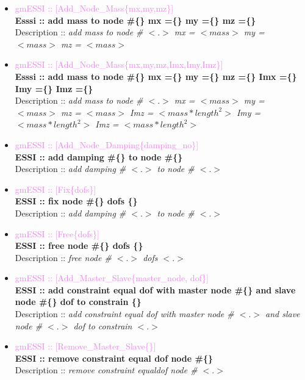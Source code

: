 \documentclass[11pt]{article}
\begin{document}
\begin{itemize}

  \item \textcolor{violet}{gmESSI :: [Add\_Node\_Mass\{mx,my,mz\}]}\\
  \textbf{Esssi :: add mass to node \#\{\} mx =\{\} my =\{\} mz =\{\}}\\
  Description :: \textit{add mass to node \# $<.>$ mx = $<mass>$ my = $<mass>$
  mz = $<mass>$}

  \item \textcolor{violet}{gmESSI :: [Add\_Node\_Mass\{mx,my,mz,Imx,Imy,Imz\}]} \\ 
  \textbf{Esssi :: add mass to node \#\{\} mx =\{\} my =\{\} mz =\{\} Imx =\{\} Imy =\{\} Imz
  =\{\}}\\   Description :: \textit{add mass to node \# $<.>$ mx = $<mass>$ my =
  $<mass>$ mz = $<mass>$ Imz = $<mass*length^2>$ Imy = $<mass*length^2>$ Imz =
  $<mass*length^2>$}

  \item \textcolor{violet}{ gmESSI :: [Add\_Node\_Damping\{damping\_no\}]}\\
  \textbf{ ESSI :: add damping \#\{\} to node \#\{\}}\\
  Description :: \textit{add damping \# $<.>$ to node \# $<.>$}

  \item \textcolor{violet}{ gmESSI :: [Fix\{dofs\}]}\\
  \textbf{ ESSI :: fix node \#\{\} dofs \{\}}\\
  Description :: \textit{add damping \# $<.>$ to node \# $<.>$}

  \item \textcolor{violet}{ gmESSI :: [Free\{dofs\}]}\\
  \textbf{ ESSI :: free node \#\{\} dofs \{\}}\\
  Description :: \textit{free node \# $<.>$ dofs $<.>$}

  \item \textcolor{violet}{ gmESSI :: [Add\_Master\_Slave\{master\_node, dof\}]}\\
  \textbf{ ESSI :: add constraint equal dof with master node \#\{\} and slave node \#\{\}  dof to constrain \{\}}\\
  Description :: \textit{add constraint equal dof with master node \# $<.>$ and slave node \# $<.>$ dof to constrain $<.>$}

  \item \textcolor{violet}{ gmESSI :: [Remove\_Master\_Slave\{\}]}\\
  \textbf{ ESSI :: remove constraint equal dof node \#\{\} }\\
  Description :: \textit{remove constraint equaldof node \# $<.>$}


\end{itemize}
\end{document}

